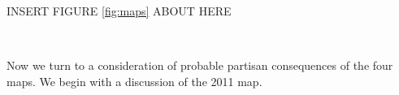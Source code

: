 %
 \begin{center} INSERT FIGURE \ref{fig:maps} ABOUT HERE \end{center}
        \
\par
    Now we turn to a consideration of probable partisan consequences of the four maps. We begin with a discussion of the 2011 map.
\par
